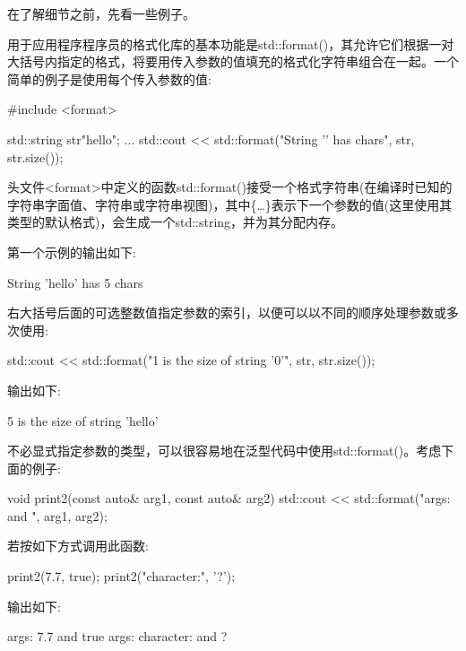 
在了解细节之前，先看一些例子。


用于应用程序程序员的格式化库的基本功能是std::format()，其允许它们根据一对大括号内指定的格式，将要用传入参数的值填充的格式化字符串组合在一起。一个简单的例子是使用每个传入参数的值:

\begin{cpp}
#include <format>

std::string str{"hello"};
...
std::cout << std::format("String '{}' has {} chars\n", str, str.size());
\end{cpp}

头文件<format>中定义的函数std::format()接受一个格式字符串(在编译时已知的字符串字面值、字符串或字符串视图)，其中\{…\}表示下一个参数的值(这里使用其类型的默认格式)，会生成一个std::string，并为其分配内存。

第一个示例的输出如下:

\begin{shell}
String ’hello’ has 5 chars
\end{shell}

右大括号后面的可选整数值指定参数的索引，以便可以以不同的顺序处理参数或多次使用:

\begin{cpp}
std::cout << std::format("{1} is the size of string '{0}'\n", str, str.size());
\end{cpp}

输出如下:

\begin{shell}
5 is the size of string ’hello’
\end{shell}

不必显式指定参数的类型，可以很容易地在泛型代码中使用std::format()。考虑下面的例子:

\begin{cpp}
void print2(const auto& arg1, const auto& arg2)
{
	std::cout << std::format("args: {} and {}\n", arg1, arg2);
}
\end{cpp}

若按如下方式调用此函数:

\begin{cpp}
print2(7.7, true);
print2("character:", '?');
\end{cpp}

输出如下:

\begin{shell}
args: 7.7 and true
args: character: and ?
\end{shell}

